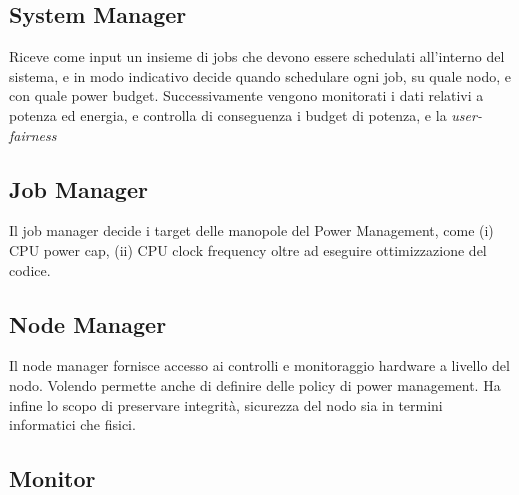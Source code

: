 \subsection{System Manager}
Riceve come input un insieme di jobs che devono essere schedulati all'interno del sistema, e in modo indicativo decide quando schedulare ogni job, su quale nodo, e con quale power budget. Successivamente vengono monitorati i dati relativi a potenza ed energia, e controlla di conseguenza i budget di potenza, e la \emph{user-fairness}


\subsection{Job Manager}
Il job manager decide i target delle manopole del Power Management, come (i) CPU power cap, (ii) CPU clock frequency oltre ad eseguire ottimizzazione del codice.

\subsection{Node Manager}
Il node manager fornisce accesso ai controlli e monitoraggio hardware a livello del nodo. Volendo permette anche di definire delle policy di power management. Ha infine lo scopo di preservare integrità, sicurezza del nodo sia in termini informatici che fisici.


\subsection{Monitor}

